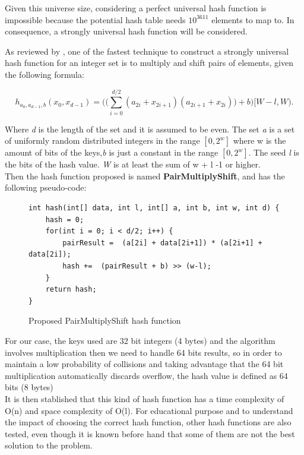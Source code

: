 \documentclass[a4paper,12pt]{article}
\begin{document}
Given this universe size, considering a perfect universal hash function is impossible because the potential hash table needs $10^{3611}$ elements to map to. In consequence, a strongly universal hash function will be considered.

As reviewed by \cite{thorup2015high}, one of the fastest technique to construct a strongly universal hash function for an integer set is to multiply and shift pairs of elements, given the following formula:

\begin{equation}
	h_{a_0,a_{d-1},b} (x_0, x_{d-1}) = \Bigg(\Bigg( \sum_{i=0}^{d/2} (a_{2i} + x_{2i+1})  (a_{2i+1} + x_{2i})\Bigg)  + b\Bigg) [W-l, W).
\end{equation}

Where {\it d}  is the length of the set and it is assumed to be even. The set {\it a} is a set of uniformly random distributed integers in the  range $[0,2^w]$ where w is the amount of bits of the keys,{\it b}  is just a constant in the range $[0,2^w]$. The seed {\it l}  is the bits of the hash value. {\it W}  is at least the sum of w + l -1 or higher. \\
Then the hash function proposed is named {\bf PairMultiplyShift}, and has the following pseudo-code:

\begin{figure}[H]
\begin{verbatim}
int hash(int[] data, int l, int[] a, int b, int w, int d) {
    hash = 0;
    for(int i = 0; i < d/2; i++) {
        pairResult =  (a[2i] + data[2i+1]) * (a[2i+1] + data[2i]);
        hash +=  (pairResult + b) >> (w-l);
    }
    return hash;
}
\end{verbatim}
\caption{Proposed PairMultiplyShift hash function}
\end{figure}

For our case, the keys used are 32 bit integers (4 bytes) and the algorithm involves multiplication then we need to handle 64 bits results, so in order to maintain a low probability of collisions and taking advantage that the 64 bit multiplication automatically discards overflow,  the hash value is defined as 64 bits (8 bytes)
\\

It is then stablished that this kind of hash function has a time complexity of O(n) and space complexity of O(l). For educational purpose and to understand the impact of choosing the correct hash function, other hash functions are also tested, even though it is known before hand that some of them are not the best solution to the problem.
\end{document}
